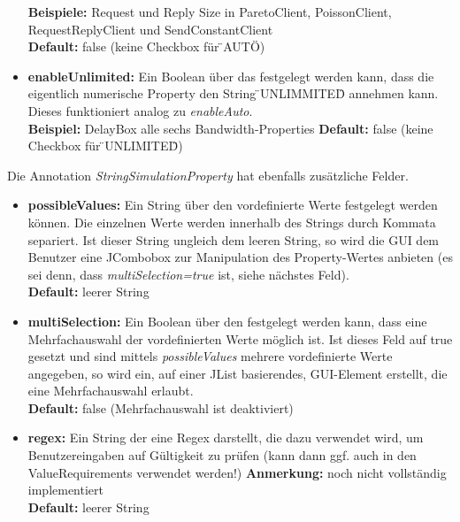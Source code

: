 \documentclass[a4paper, 11pt]{article} %
\begin{document}
\begin{itemize}
	\textbf{Beispiele:} Request und Reply Size in ParetoClient, PoissonClient, RequestReplyClient und SendConstantClient\\
	\textbf{Default:} false (keine Checkbox für \"{}AUTO\"{}) 
	\item \textbf{enableUnlimited:} Ein Boolean über das festgelegt werden kann, dass die eigentlich numerische Property den String \"{}UNLIMMITED\"{} annehmen kann. Dieses funktioniert analog zu \emph{enableAuto}.\\
	\textbf{Beispiel:} DelayBox alle sechs Bandwidth-Properties
	\textbf{Default:} false (keine Checkbox für \"{}UNLIMITED\"{})
\end{itemize}

Die Annotation \emph{StringSimulationProperty} hat ebenfalls zusätzliche Felder.
\begin{itemize}
	\item \textbf{possibleValues:} Ein String über den vordefinierte Werte festgelegt werden können. Die einzelnen Werte werden innerhalb des Strings durch Kommata separiert. Ist dieser String ungleich dem leeren String, so wird die GUI dem Benutzer eine JCombobox zur Manipulation des Property-Wertes anbieten (es sei denn, dass \emph{multiSelection=true} ist, siehe nächstes Feld).\\
	\textbf{Default:} leerer String
	\item \textbf{multiSelection:} Ein Boolean über den festgelegt werden kann, dass eine Mehrfachauswahl der vordefinierten Werte möglich ist. Ist dieses Feld auf true gesetzt und sind mittels \emph{possibleValues} mehrere vordefinierte Werte angegeben, so wird ein, auf einer JList basierendes, GUI-Element erstellt, die eine Mehrfachauswahl erlaubt.\\
	\textbf{Default:} false (Mehrfachauswahl ist deaktiviert) 
	\item \textbf{regex:} Ein String der eine Regex darstellt, die dazu verwendet wird, um Benutzereingaben auf Gültigkeit zu prüfen (kann dann ggf. auch in den ValueRequirements verwendet werden!)
	\textbf{Anmerkung:} noch nicht vollständig implementiert\\
	\textbf{Default:} leerer String
\end{itemize}

\end{document}
